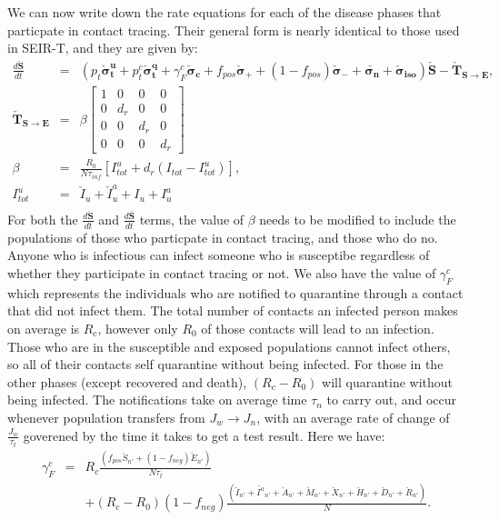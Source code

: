 \documentclass[notitlepage, superscriptaddress]{revtex4-2}
\begin{document}
We can now write down the rate equations for each of the disease phases that particpate in contact tracing. Their general form is nearly identical to those used in SEIR-T, and they are given by:
\begin{eqnarray}
\frac{d \boldsymbol{\check{S}}}{dt} &=& \left( p_{t} \boldsymbol{\check{\sigma}^{u}_{t}} + p^{c}_{t} \boldsymbol{\check{\sigma}^{q}_{t}} + \gamma^{c}_{F} \boldsymbol{\check{\sigma}_{c}} + f_{pos} \boldsymbol{\check{\sigma}_{+}} + (1-f_{pos}) \boldsymbol{\check{\sigma}_{-}} + \boldsymbol{\check{\sigma_{n}}} + \boldsymbol{\check{\sigma}_{iso}} \right) \boldsymbol{\check{S}} - \boldsymbol{\check{T}_{S \rightarrow E}}, \\
%
\boldsymbol{\check{T}_{S \rightarrow E}} &=& \beta
    \begin{bmatrix}
    1 & 0 & 0 & 0 \\ 
    0 & d_{r} & 0 & 0 \\
    0 & 0 & d_{r} & 0 \\
    0 & 0 & 0 & d_{r}
    \end{bmatrix} \\ 
%
\beta &=& \frac{R_{0}}{N\tau_{inf}} \left[ {I^{u}_{tot}} + d_{r} (I_{tot} - {I^{u}_{tot}}) \right], \\%
{I^{u}_{tot}} &=& {\check{I}_{u}} + {\check{I}^{a}_{u}}+ {{I}_{u}} + {{I}^{a}_{u}} \\ 
\end{eqnarray}
For both the $\frac{d \boldsymbol{\check{S}}}{dt}$ and $\frac{d \boldsymbol{\bar{S}}}{dt}$ terms, the value of $\beta$ needs to be modified to include the populations of those who particpate in contact tracing, and those who do no. Anyone who is infectious can infect someone who is susceptibe regardless of whether they participate in contact tracing or not. We also have the value of $\gamma^{c}_{F}$ which represents the individuals who are notified to quarantine through a contact that did not infect them. The total number of contacts an infected person makes on average is $R_{c}$, however only $R_{0}$ of those contacts will lead to an infection. Those who are in the susceptible and exposed populations cannot infect others, so all of their contacts self quarantine without being infected. For those in the other phases (except recovered and death), $(R_{c} - R_{0})$ will quarantine without being infected. The notifications take on average time $\tau_{n}$ to carry out, and occur whenever population transfers from $J_{w} \rightarrow J_{n}$, with an average rate of change of $\frac{J_{w}}{\tau_{t}}$ goverened by the time it takes to get a test result. Here we have:
\begin{eqnarray}
\gamma^{c}_{F} &=& R_{c} \frac{(f_{pos} \check{S}_{n'} + (1-f_{neg})\check{E}_{n'})}{N \tau_{t}} \nonumber \\ 
&& + (R_{c} - R_{0}) (1-f_{neg}) \frac{(\check{I}_{n'} + \check{I^{a}}_{n'} + \check{A}_{n'} + \check{M}_{n'} + \check{X}_{n'} + \check{H}_{n'} + \check{D}_{n'} + \check{R}_{n'} )}{N }.
\end{eqnarray} 
\end{document}
